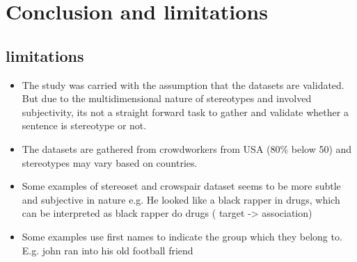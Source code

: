 \chapter{Conclusion and limitations}

\section{limitations}

\begin{itemize}
    \item The study was carried with the assumption that the datasets are validated. But due to the multidimensional nature of stereotypes and involved subjectivity, its not a straight forward task to gather and validate whether a sentence is stereotype or not.  
    \item The datasets are gathered from crowdworkers from USA (80\% below 50) and stereotypes may vary based on countries. 
    \item Some examples of stereoset and crowspair dataset seems to be more subtle and subjective in nature e.g. He looked like a black rapper in drugs, which can be interpreted as black rapper do drugs ( target -> association)
    \item Some examples use first names to indicate the group which they belong to.
    E.g. john ran into his old football friend
\end{itemize}